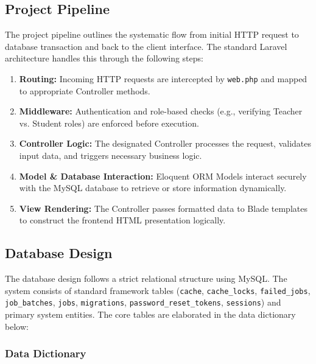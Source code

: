 \subsection{Project Pipeline}
The project pipeline outlines the systematic flow from initial HTTP request to database transaction and back to the client interface. The standard Laravel architecture handles this through the following steps:
\begin{enumerate}
    \item \textbf{Routing:} Incoming HTTP requests are intercepted by \texttt{web.php} and mapped to appropriate Controller methods.
    \item \textbf{Middleware:} Authentication and role-based checks (e.g., verifying Teacher vs. Student roles) are enforced before execution.
    \item \textbf{Controller Logic:} The designated Controller processes the request, validates input data, and triggers necessary business logic.
    \item \textbf{Model \& Database Interaction:} Eloquent ORM Models interact securely with the MySQL database to retrieve or store information dynamically.
    \item \textbf{View Rendering:} The Controller passes formatted data to Blade templates to construct the frontend HTML presentation logically.
\end{enumerate}

\subsection{Database Design}

The database design follows a strict relational structure using MySQL. The system consists of standard framework tables (\texttt{cache}, \texttt{cache\_locks}, \texttt{failed\_jobs}, \texttt{job\_batches}, \texttt{jobs}, \texttt{migrations}, \texttt{password\_reset\_tokens}, \texttt{sessions}) and primary system entities. The core tables are elaborated in the data dictionary below:

\subsubsection{Data Dictionary}

